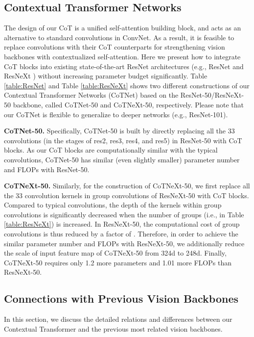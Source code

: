 \documentclass[10pt,twocolumn,letterpaper]{article}
\begin{document}
\subsection{Contextual Transformer Networks}

The design of our CoT is a unified self-attention building block, and acts as an alternative to standard convolutions in ConvNet. As a result, it is feasible to replace convolutions with their CoT counterparts for strengthening vision backbones with contextualized self-attention. Here we present how to integrate CoT blocks into existing state-of-the-art ResNet architectures (e.g., ResNet \cite{he2016deep} and ResNeXt \cite{xie2017aggregated}) without increasing parameter budget significantly. Table \ref{table:ResNet} and Table \ref{table:ResNeXt} shows two different constructions of our Contextual Transformer Networks (CoTNet) based on the ResNet-50/ResNeXt-50 backbone, called CoTNet-50 and CoTNeXt-50, respectively. Please note that our CoTNet is flexible to generalize to deeper networks (e.g., ResNet-101).

\textbf{CoTNet-50.} Specifically, CoTNet-50 is built by directly replacing all the 33 convolutions (in the stages of res2, res3, res4, and res5) in ResNet-50 with CoT blocks. As our CoT blocks are computationally similar with the typical convolutions, CoTNet-50 has similar (even slightly smaller) parameter number and FLOPs with ResNet-50.

\textbf{CoTNeXt-50.} Similarly, for the construction of CoTNeXt-50, we first replace all the 33 convolution kernels in group convolutions of ResNeXt-50 with CoT blocks. Compared to typical convolutions, the depth of the kernels within group convolutions is significantly decreased when the number of groups (i.e.,  in Table \ref{table:ResNeXt}) is increased. In ResNeXt-50, the computational cost of group convolutions is thus reduced by a factor of . Therefore, in order to achieve the similar parameter number and FLOPs with ResNeXt-50, we additionally reduce the scale of input feature map of CoTNeXt-50 from 324d to 248d. Finally, CoTNeXt-50 requires only 1.2 more parameters and 1.01 more FLOPs than ResNeXt-50.



\subsection{Connections with Previous Vision Backbones}

In this section, we discuss the detailed relations and differences between our Contextual Transformer and the previous most related vision backbones.
\end{document}
